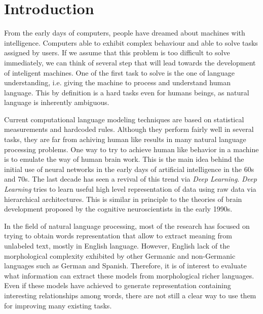 \chapter{Introduction}
\label{chapter:Introduction}


From the early days of computers, people have dreamed about machines with intelligence. Computers able to exhibit complex behaviour and able to solve tasks assigned by users. If we assume that this problem is too difficult to solve immediately,  we can think of several step that will lead towards the development of inteligent machines. One of the first task to solve  is the one of language understanding, i.e. giving the machine to process and understand human language. This by definition is a hard tasks even for humans beings, as  natural language is inherently ambiguous.

Current computational language modeling techniques are based on statistical measurements and hardcoded rules. Although they perform fairly well in several tasks, they are far from achiving human like results in many natural language processing problems.
One way to try to achieve human like behavior in a machine is to emulate the way of human brain work. This is the main idea behind the initial use of neural networks in the early days  of artificial intelligence in the 60s and 70s. The last decade has seen a revival of this trend via  \textit{Deep Learning}. \textit{Deep Learning} tries to learn useful high level representation of data using raw data via hierarchical architectures. This is similar in principle to the theories of brain development proposed by the cognitive neuroscientists in the early 1990s. 

In the field of natural language processing, most of the research  has focused on  trying to obtain words representation that allow to extract meaning from unlabeled text, mostly in English language.  However,  English lack of the morphological complexity exhibited by other Germanic and non-Germanic languages such as German and Spanish. Therefore, it  is of interest to evaluate what information can extract these models from morphological richer languages. Even if these models have achieved to generate representation containing  interesting relationships among words, there are not still a clear way to use them for improving many existing tasks.



% 


